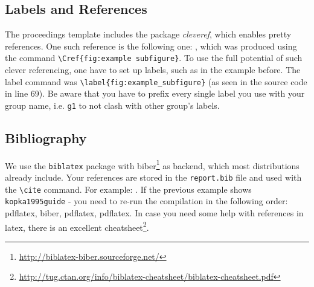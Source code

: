 \subsection*{Labels and References}
The proceedings template includes the package \textit{cleveref}, which enables pretty references. One such reference is the following one: , which was produced using the command \verb|\Cref{fig:example subfigure}|.
To use the full potential of such clever referencing, one have to set up labels, such as in the example before. The label command was \verb|\label{fig:example_subfigure}| (as seen in the source code in line 69).
Be aware that you have to prefix every single label you use with your group name, i.e. \verb|g1| to not clash with other group's labels.

\subsection*{Bibliography}
We use the \verb|biblatex| package with biber\footnote{\url{http://biblatex-biber.sourceforge.net/}} as backend, which most distributions already include.
Your references are stored in the \texttt{report.bib} file and used with the \texttt{\textbackslash cite} command. 
For example: \cite{kopka1995guide}. 
If the previous example shows \verb|kopka1995guide| - you need to re-run the compilation in the following order: pdflatex, biber, pdflatex, pdflatex.
In case you need some help with references in latex, there is an excellent cheatsheet\footnote{\url{http://tug.ctan.org/info/biblatex-cheatsheet/biblatex-cheatsheet.pdf}}.


\pagebreak